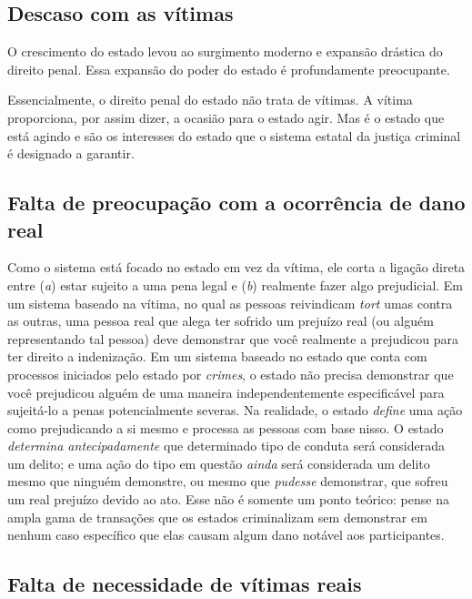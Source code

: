 \subsection*{Descaso com as vítimas}

O crescimento do estado levou ao surgimento moderno e expansão drástica do direito penal. Essa expansão do poder do estado é profundamente preocupante.

Essencialmente, o direito penal do estado não trata de vítimas. A vítima proporciona, por assim dizer, a ocasião para o estado agir. Mas é o estado que está agindo e são os interesses do estado que o sistema estatal da justiça criminal é designado a garantir.

\subsection*{Falta de preocupação com a ocorrência de dano real}

Como o sistema está focado no estado em vez da vítima, ele corta a ligação direta entre (\emph{a}) estar sujeito a uma pena legal e (\emph{b}) realmente fazer algo prejudicial. Em um sistema baseado na vítima, no qual as pessoas reivindicam \emph{tort} umas contra as outras, uma pessoa real que alega ter sofrido um prejuízo real (ou alguém representando tal pessoa) deve demonstrar que você realmente a prejudicou para ter direito a indenização. Em um sistema baseado no estado que conta com processos iniciados pelo estado por \emph{crimes}, o estado não precisa demonstrar que você prejudicou alguém de uma maneira independentemente especificável para sujeitá-lo a penas potencialmente severas. Na realidade, o estado \emph{define} uma ação como prejudicando a si mesmo e processa as pessoas com base nisso. O estado \emph{determina antecipadamente} que determinado tipo de conduta será considerada um delito; e uma ação do tipo em questão \emph{ainda} será considerada um delito mesmo que ninguém demonstre, ou mesmo que \emph{pudesse} demonstrar, que sofreu um real prejuízo devido ao ato. Esse não é somente um ponto teórico: pense na ampla gama de transações que os estados criminalizam sem demonstrar em nenhum caso específico que elas causam algum dano notável aos participantes.

\subsection*{Falta de necessidade de vítimas reais}


